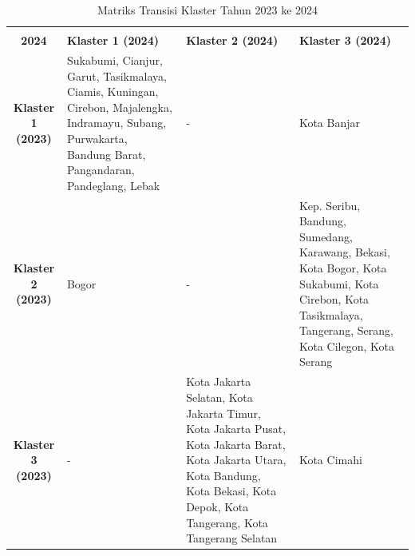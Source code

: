 \begin{table}[H]
\centering
\caption{Matriks Transisi Klaster Tahun 2023 ke 2024} \label{tab:transisi_2023_2024}
\begin{tabular}{|c|p{2cm}|p{2cm}|p{2cm}|}
\hline
\makecell{\textbf{Tahun 2023} \\ \textbf{2024}} & \textbf{Klaster 1 (2024)} & \textbf{Klaster 2 (2024)} & \textbf{Klaster 3 (2024)} \\ \hline
\textbf{Klaster 1 (2023)} & Sukabumi, Cianjur, Garut, Tasikmalaya, Ciamis, Kuningan, Cirebon, Majalengka, Indramayu, Subang, Purwakarta, Bandung Barat, Pangandaran, Pandeglang, Lebak & - & Kota Banjar \\ \hline
\textbf{Klaster 2 (2023)} & Bogor & - & Kep. Seribu, Bandung, Sumedang, Karawang, Bekasi, Kota Bogor, Kota Sukabumi, Kota Cirebon, Kota Tasikmalaya, Tangerang, Serang, Kota Cilegon, Kota Serang \\ \hline
\textbf{Klaster 3 (2023)} & - & Kota Jakarta Selatan, Kota Jakarta Timur, Kota Jakarta Pusat, Kota Jakarta Barat, Kota Jakarta Utara, Kota Bandung, Kota Bekasi, Kota Depok, Kota Tangerang, Kota Tangerang Selatan & Kota Cimahi \\ \hline
\end{tabular}
\end{table}